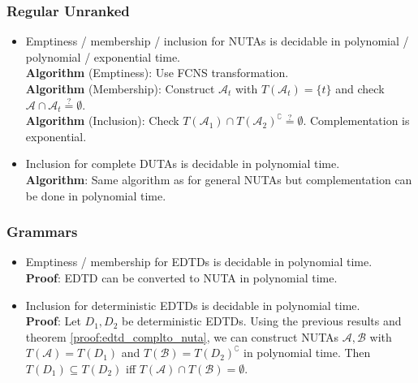 \documentclass{article}
\begin{document}
\subsubsection{Regular Unranked}
\begin{itemize}
	\item Emptiness / membership / inclusion for NUTAs is decidable in polynomial / polynomial / exponential time. \\
		\textbf{Algorithm} (Emptiness): Use FCNS transformation. \\
		\textbf{Algorithm} (Membership): Construct $\mathcal{A}_t$ with $T(\mathcal{A}_t) = \{t\}$ and check $\mathcal{A} \cap \mathcal{A}_t \overset{?}{=} \emptyset$. \\
		\textbf{Algorithm} (Inclusion): Check $T(\mathcal{A}_1) \cap T(\mathcal{A}_2)^\complement \overset{?}{=} \emptyset$. Complementation is exponential.
	\item Inclusion for complete DUTAs is decidable in polynomial time. \\
		\textbf{Algorithm}: Same algorithm as for general NUTAs but complementation can be done in polynomial time.
\end{itemize}

\subsubsection{Grammars}
\begin{itemize}
	\item Emptiness / membership for EDTDs is decidable in polynomial time. \\
		\textbf{Proof}: EDTD can be converted to NUTA in polynomial time.
	\item Inclusion for deterministic EDTDs is decidable in polynomial time. \\
		\textbf{Proof}: Let $D_1, D_2$ be deterministic EDTDs. Using the previous results and theorem \ref{proof:edtd_complto_nuta}, we can construct NUTAs $\mathcal{A}, \mathcal{B}$ with $T(\mathcal{A}) = T(D_1)$ and $T(\mathcal{B}) = T(D_2)^\complement$ in polynomial time. Then $T(D_1) \subseteq T(D_2)$ iff $T(\mathcal{A}) \cap T(\mathcal{B}) = \emptyset$.
\end{itemize}

\newpage
\end{document}
